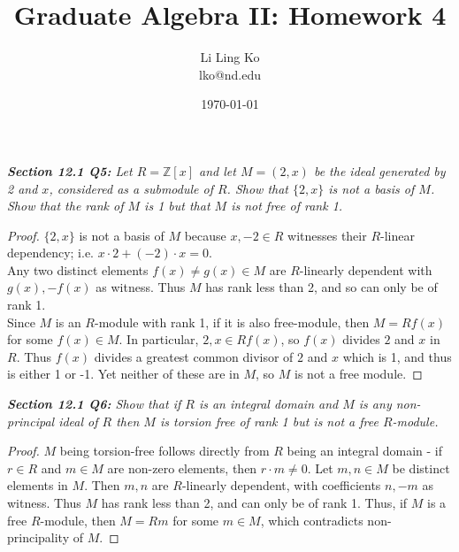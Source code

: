 \documentclass{article}
\begin{document}
\title{Graduate Algebra II: Homework 4}
\author{Li Ling Ko\\ lko@nd.edu}
\date{\today}
\maketitle

\it \textbf{Section 12.1 Q5:} Let $R=\mathbb{Z}[x]$ and let $M=(2,x)$ be
  the ideal generated by 2 and $x$, considered as a submodule of $R$. Show
  that $\{2,x\}$ is not a basis of $M$. Show that the rank of $M$ is 1 but
  that $M$ is not free of rank 1.

  \begin{proof}
    $\{2,x\}$ is not a basis of $M$ because $x,-2\in R$ witnesses their
    $R$-linear dependency; i.e. $x\cdot2+(-2)\cdot x=0$. \\

    Any two distinct elements $f(x)\neq g(x)\in M$ are $R$-linearly
    dependent with $g(x),-f(x)$ as witness. Thus $M$ has rank less than 2,
    and so can only be of rank 1. \\

    Since $M$ is an $R$-module with rank 1, if it is also free-module, then
    $M=Rf(x)$ for some $f(x)\in M$. In particular, $2,x\in Rf(x)$, so
    $f(x)$ divides $2$ and $x$ in $R$. Thus $f(x)$ divides a greatest
    common divisor of $2$ and $x$ which is 1, and thus is either 1 or -1.
    Yet neither of these are in $M$, so $M$ is not a free module.
  \end{proof}

\it \textbf{Section 12.1 Q6:} Show that if $R$ is an integral domain and
  $M$ is any non-principal ideal of $R$ then $M$ is torsion free of rank 1
  but is not a free $R$-module.

  \begin{proof}
    $M$ being torsion-free follows directly from $R$ being an integral
    domain - if $r\in R$ and $m\in M$ are non-zero elements, then $r\cdot
    m\neq 0$. Let $m,n\in M$ be distinct elements in $M$. Then $m,n$ are
    $R$-linearly dependent, with coefficients $n,-m$ as witness. Thus $M$
    has rank less than 2, and can only be of rank 1. Thus, if $M$ is a free
    $R$-module, then $M=Rm$ for some $m\in M$, which contradicts
    non-principality of $M$.
  \end{proof}
\end{document}
